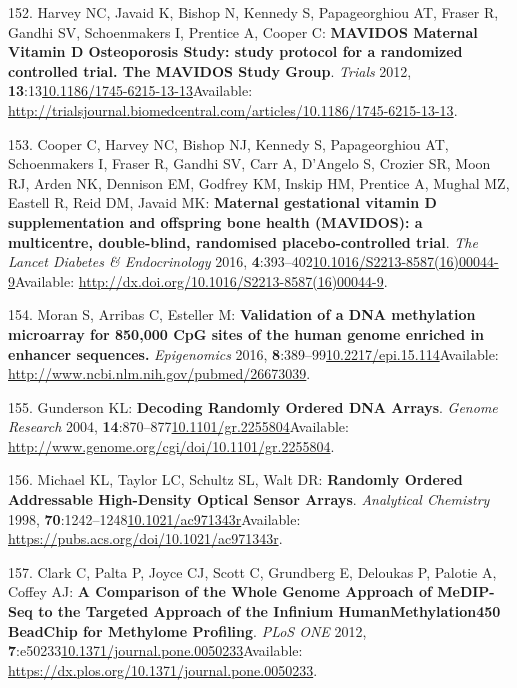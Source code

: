 \documentclass[
]{book}
\begin{document}
\leavevmode\hypertarget{ref-Harvey2012a}{}%
152. Harvey NC, Javaid K, Bishop N, Kennedy S, Papageorghiou AT, Fraser R, Gandhi SV, Schoenmakers I, Prentice A, Cooper C: \textbf{MAVIDOS Maternal Vitamin D Osteoporosis Study: study protocol for a randomized controlled trial. The MAVIDOS Study Group}. \emph{Trials} 2012, \textbf{13}:13\href{https://doi.org/10.1186/1745-6215-13-13}{10.1186/1745-6215-13-13}Available: \url{http://trialsjournal.biomedcentral.com/articles/10.1186/1745-6215-13-13}.

\leavevmode\hypertarget{ref-Cooper2016}{}%
153. Cooper C, Harvey NC, Bishop NJ, Kennedy S, Papageorghiou AT, Schoenmakers I, Fraser R, Gandhi SV, Carr A, D'Angelo S, Crozier SR, Moon RJ, Arden NK, Dennison EM, Godfrey KM, Inskip HM, Prentice A, Mughal MZ, Eastell R, Reid DM, Javaid MK: \textbf{Maternal gestational vitamin D supplementation and offspring bone health (MAVIDOS): a multicentre, double-blind, randomised placebo-controlled trial}. \emph{The Lancet Diabetes \& Endocrinology} 2016, \textbf{4}:393--402\href{https://doi.org/10.1016/S2213-8587(16)00044-9}{10.1016/S2213-8587(16)00044-9}Available: \url{http://dx.doi.org/10.1016/S2213-8587(16)00044-9}.

\leavevmode\hypertarget{ref-Moran2015}{}%
154. Moran S, Arribas C, Esteller M: \textbf{Validation of a DNA methylation microarray for 850,000 CpG sites of the human genome enriched in enhancer sequences.} \emph{Epigenomics} 2016, \textbf{8}:389--99\href{https://doi.org/10.2217/epi.15.114}{10.2217/epi.15.114}Available: \url{http://www.ncbi.nlm.nih.gov/pubmed/26673039}.

\leavevmode\hypertarget{ref-Gunderson2004}{}%
155. Gunderson KL: \textbf{Decoding Randomly Ordered DNA Arrays}. \emph{Genome Research} 2004, \textbf{14}:870--877\href{https://doi.org/10.1101/gr.2255804}{10.1101/gr.2255804}Available: \url{http://www.genome.org/cgi/doi/10.1101/gr.2255804}.

\leavevmode\hypertarget{ref-Michael1998}{}%
156. Michael KL, Taylor LC, Schultz SL, Walt DR: \textbf{Randomly Ordered Addressable High-Density Optical Sensor Arrays}. \emph{Analytical Chemistry} 1998, \textbf{70}:1242--1248\href{https://doi.org/10.1021/ac971343r}{10.1021/ac971343r}Available: \url{https://pubs.acs.org/doi/10.1021/ac971343r}.

\leavevmode\hypertarget{ref-Clark2012}{}%
157. Clark C, Palta P, Joyce CJ, Scott C, Grundberg E, Deloukas P, Palotie A, Coffey AJ: \textbf{A Comparison of the Whole Genome Approach of MeDIP-Seq to the Targeted Approach of the Infinium HumanMethylation450 BeadChip for Methylome Profiling}. \emph{PLoS ONE} 2012, \textbf{7}:e50233\href{https://doi.org/10.1371/journal.pone.0050233}{10.1371/journal.pone.0050233}Available: \url{https://dx.plos.org/10.1371/journal.pone.0050233}.
\end{document}
